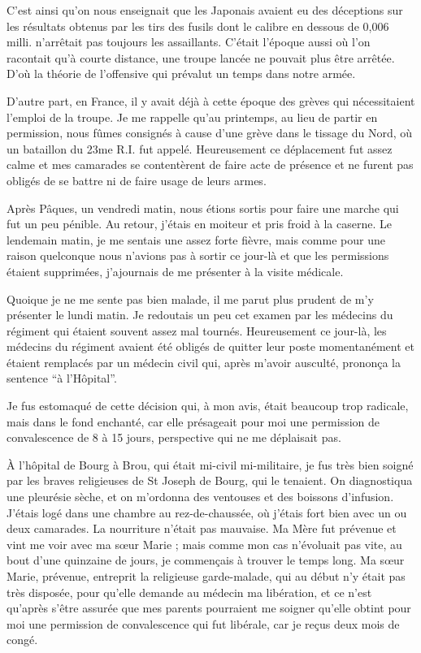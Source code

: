 \documentclass[11pt,a4paper]{report}
\begin{document}
C'est ainsi qu'on nous enseignait que les Japonais avaient eu des déceptions sur les résultats obtenus par les tirs des fusils dont le calibre en dessous de 0,006 milli. n'arrêtait pas toujours les assaillants. C'était l'époque aussi où l'on racontait qu'à courte distance, une troupe lancée ne pouvait plus être arrêtée. D'où la théorie de l'offensive qui prévalut un temps dans notre armée.

D'autre part, en France, il y avait déjà à cette époque des grèves qui nécessitaient l'emploi de la troupe. Je me rappelle qu'au printemps, au lieu de partir en permission, nous fûmes consignés à cause d'une grève dans le tissage du Nord, où un bataillon du 23me R.I. fut appelé. Heureusement ce déplacement fut assez calme et mes camarades se contentèrent de faire acte de présence et ne furent pas obligés de se battre ni de faire usage de leurs armes.

Après Pâques, un vendredi matin, nous étions sortis pour faire une marche qui fut un peu pénible. Au retour, j'étais en moiteur et pris froid à la caserne. Le lendemain matin, je me sentais une assez forte fièvre, mais comme pour une raison quelconque nous n'avions pas à sortir ce jour-là et que les permissions étaient supprimées, j'ajournais de me présenter à la visite médicale.

Quoique je ne me sente pas bien malade, il me parut plus prudent de m'y présenter le lundi matin. Je redoutais un peu cet examen par les médecins du régiment qui étaient souvent assez mal tournés. Heureusement ce jour-là, les médecins du régiment avaient été obligés de quitter leur poste momentanément et étaient remplacés par un médecin civil qui, après m'avoir ausculté, prononça la sentence ``à l'Hôpital''.

Je fus estomaqué de cette décision qui, à mon avis, était beaucoup trop radicale, mais dans le fond enchanté, car elle présageait pour moi une permission de convalescence de 8 à 15 jours, perspective qui ne me déplaisait pas.

À l'hôpital de Bourg à Brou, qui était mi-civil mi-militaire, je fus très bien soigné par les braves religieuses de St Joseph de Bourg, qui le tenaient. On diagnostiqua une pleurésie sèche, et on m'ordonna des ventouses et des boissons d'infusion. J'étais logé dans une chambre au rez-de-chaussée, où j'étais fort bien avec un ou deux camarades. La nourriture n'était pas mauvaise. Ma Mère fut prévenue et vint me voir avec ma sœur Marie ; mais comme mon cas n'évoluait pas vite, au bout d'une quinzaine de jours, je commençais à trouver le temps long. Ma sœur Marie, prévenue, entreprit la religieuse garde-malade, qui au début n'y était pas très disposée, pour qu'elle demande au médecin ma libération, et ce n'est qu'après s'être assurée que mes parents pourraient me soigner qu'elle obtint pour moi une permission de convalescence qui fut libérale, car je reçus deux mois de congé.
\end{document}
